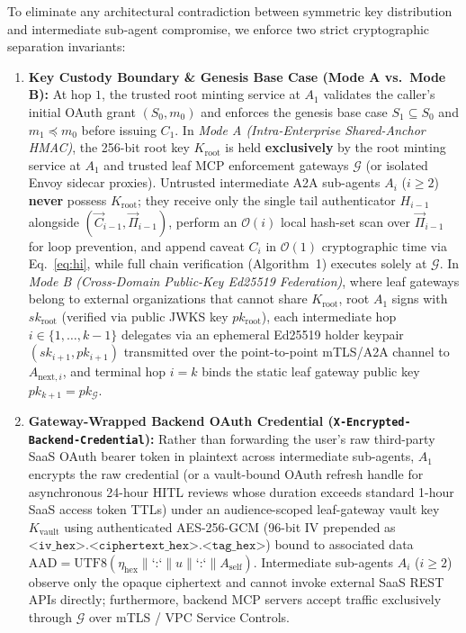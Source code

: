 \documentclass[conference,10pt]{IEEEtran}
\begin{document}
To eliminate any architectural contradiction between symmetric key distribution and intermediate sub-agent compromise, we enforce two strict cryptographic separation invariants:
\begin{enumerate}
    \item \textbf{Key Custody Boundary \& Genesis Base Case (Mode A vs.\ Mode B):} At hop $1$, the trusted root minting service at $A_1$ validates the caller's initial OAuth grant $(S_0, m_0)$ and enforces the genesis base case $S_1 \subseteq S_0$ and $m_1 \preceq m_0$ before issuing $C_1$. In \emph{Mode A (Intra-Enterprise Shared-Anchor HMAC)}, the 256-bit root key $K_{\text{root}}$ is held \textbf{exclusively} by the root minting service at $A_1$ and trusted leaf MCP enforcement gateways $\mathcal{G}$ (or isolated Envoy sidecar proxies). Untrusted intermediate A2A sub-agents $A_i$ ($i \ge 2$) \textbf{never} possess $K_{\text{root}}$; they receive only the single tail authenticator $H_{i-1}$ alongside $(\vec{C}_{i-1}, \vec{\Pi}_{i-1})$, perform an $\mathcal{O}(i)$ local hash-set scan over $\vec{\Pi}_{i-1}$ for loop prevention, and append caveat $C_i$ in $\mathcal{O}(1)$ cryptographic time via Eq.~\eqref{eq:hi}, while full chain verification (Algorithm~1) executes solely at $\mathcal{G}$. In \emph{Mode B (Cross-Domain Public-Key Ed25519 Federation)}, where leaf gateways belong to external organizations that cannot share $K_{\text{root}}$, root $A_1$ signs with $sk_{\text{root}}$ (verified via public JWKS key $pk_{\text{root}}$), each intermediate hop $i \in \{1, \dots, k-1\}$ delegates via an ephemeral Ed25519 holder keypair $(sk_{i+1}, pk_{i+1})$ transmitted over the point-to-point mTLS/A2A channel to $A_{\text{next},i}$, and terminal hop $i = k$ binds the static leaf gateway public key $pk_{k+1} = pk_{\mathcal{G}}$.
    \item \textbf{Gateway-Wrapped Backend OAuth Credential (\texttt{X-Encrypted-Backend-Credential}):} Rather than forwarding the user's raw third-party SaaS OAuth bearer token in plaintext across intermediate sub-agents, $A_1$ encrypts the raw credential (or a vault-bound OAuth refresh handle for asynchronous 24-hour HITL reviews whose duration exceeds standard 1-hour SaaS access token TTLs) under an audience-scoped leaf-gateway vault key $K_{\text{vault}}$ using authenticated AES-256-GCM (96-bit IV prepended as $\texttt{<iv\_hex>.<ciphertext\_hex>.<tag\_hex>}$) bound to associated data $\text{AAD} = \text{UTF8}(\eta_{\text{hex}} \parallel \text{`:`} \parallel u \parallel \text{`:`} \parallel A_{\text{self}})$. Intermediate sub-agents $A_i$ ($i \ge 2$) observe only the opaque ciphertext and cannot invoke external SaaS REST APIs directly; furthermore, backend MCP servers accept traffic exclusively through $\mathcal{G}$ over mTLS / VPC Service Controls.
\end{enumerate}
\end{document}
